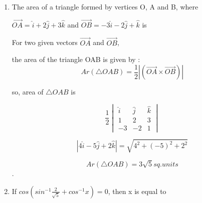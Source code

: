
\begin{enumerate}[label=\thesubsection.\arabic*, ref=\thesubsection.\theenumi]
    



\item The area of a triangle formed by vertices O, A and B, where 

$\overrightarrow{OA}=$$\hat{i}+2\hat{j}+3\hat{k}$$ $ and $\overrightarrow{OB}=$$-3\hat{i}-2\hat{j}+\hat{k}$$ $ is
\begin{enumerate}
\end{enumerate}

\solution 

For two given vectors $\overrightarrow{OA}$ and $\overrightarrow{OB}$,

the area of the triangle OAB is given by :
\begin{equation}
Ar(\triangle OAB) = \frac{1}{2}\left|(\overrightarrow{OA} \times \overrightarrow{OB})\right| \tag{1.1}
\end{equation}

so, area of  $\triangle OAB$ is

$$\frac{1}{2}\begin{vmatrix}
\hat{i}&\hat{j} &\hat{k}\\
1&2&3\\
-3&-2&1
\end{vmatrix}$$

$$ \left|4\hat{i}-5\hat{j}+2\hat{k}\right| = \sqrt{4^2 +(-5)^2 +2^2}$$

$$Ar(\triangle OAB)=3\sqrt{5} sq.units$$.

\item

If $cos(sin^{-1}\frac{2}{\sqrt{5}}+cos^{-1}x)=0$, then x is equal to 

\begin{enumerate}
\end{enumerate}
\end{enumerate}
